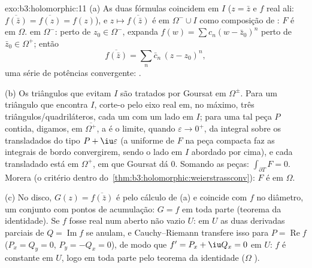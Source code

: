 \begin{solution}{exo:b3:holomorphic:11}
(a) As duas fórmulas coincidem em $I$ ($z = \bar z$ e $f$ real
ali: $\overline{f(\bar z)} = \overline{f(z)} = f(z)$), e
$z \mapsto \overline{f(\bar z)}$ é  em
$\Omega^-\cup I$ como composição de : $F$ é
 em $\Omega$.  em $\Omega^-$: perto de $z_0
\in \Omega^-$, expanda $f(w) = \sum c_n(w - \bar z_0)^n$ perto de
$\bar z_0 \in \Omega^+$; então
\[
\overline{f(\bar z)} = \sum_n\bar c_n\,(z - z_0)^n,
\]
uma série de potências convergente: .

(b) Os triângulos que evitam $I$ são tratados por Goursat em
$\Omega^\pm$. Para um triângulo que encontra $I$, corte-o pelo eixo
real em, no máximo, três triângulos/quadriláteros, cada um com
um lado em $I$; para uma tal peça $P$ contida, digamos, em
$\overline{\Omega^+}$, a  é o limite, quando
$\varepsilon \to 0^+$, da integral sobre os transladados do tipo
$P + \iu
\varepsilon$ (a  uniforme de $F$ na
peça compacta faz as integrais de bordo convergirem, sendo o
lado em $I$ abordado por cima), e cada transladado
está em $\Omega^+$, em que Goursat dá $0$. Somando as
peças: $\int_{\partial T}F = 0$. Morera (o critério
dentro do~\cref{thm:b3:holomorphic:weierstrassconv}): $F$ é
 em $\Omega$.

(c) No disco, $G(z) = \overline{f(\bar z)}$ é
 pelo cálculo de (a) e coincide com $f$ no
diâmetro, um conjunto com pontos de acumulação: $G = f$ em toda parte
(teorema da identidade). Se $f$ fosse real num aberto não vazio
$U$: em $U$ as duas derivadas parciais de $Q = \operatorname{Im}f$
se anulam, e Cauchy--Riemann transfere isso para $P =
\operatorname{Re}f$ ($P_x = Q_y = 0$, $P_y = -Q_x = 0$), de modo que
$f' = P_x + \iu Q_x = 0$ em $U$: $f$ é constante em $U$,
logo em toda parte pelo teorema da identidade ($\Omega$
).
\end{solution}

